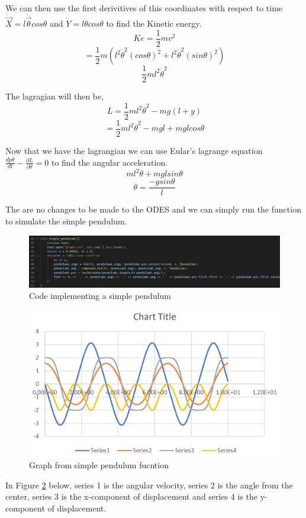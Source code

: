 \documentclass[12pt, a2paper]{article}
\begin{document}
We can then use the first derivitives of this coordinates with respect to time \(\dot{\vec{X}} = l\dot{\vec{\theta}}cos\theta\) and \(\dot{Y} = l\dot{\theta}cos\theta\) to find the Kinetic energy.
\[Ke = \frac{1}{2}mv^2\]
\[= \frac{1}{2}m(l^2\dot{\theta}^2(cos\theta)^2+l^2\dot{\theta}^2(sin\theta)^2)\]
\[\frac{1}{2}ml^2\dot{\theta}^2\]

The lagragian will then be,
\[L = \frac{1}{2}ml^2\dot{\theta}^2-mg(l+y)\]
\[= \frac{1}{2}ml^2\dot{\theta}^2-mgl+mglcos\theta\]

Now that we have the lagrangian we can use Eular's lagrange equation \(\frac{dp\theta}{dt}-\frac{\partial L}{\partial\theta} = 0\) to find the angular acceleration.
\[ml^2\ddot{\theta}+mglsin\theta\]
\[\ddot{\theta} = \frac{-gsin\theta}{l}\]

The are no changes to be made to the ODES and we can simply run the function to simulate the simple pendulum.
\begin{figure}[h]
\center
\includegraphics[width=1\textwidth]{Simple pendulum function}
\caption{Code implementing a simple pendulum}
\label{fig 4}
\end{figure}
\begin{figure}[h]
\center
\includegraphics[width=1\textwidth]{Simple pendulum graph}
\caption{Graph from simple pendulum fucntion}
\label{Graph 3}
\end{figure}
\pagebreak

In Figure \ref{Graph 3}  below, series 1 is the angular velocity, series 2 is the angle from the center, series 3 is the x-component of displacement and series 4 is the y-component of displacement.
\end{document}
